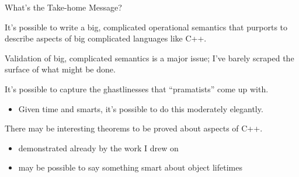 \documentclass[compress,dvips,color=usenames,xcolor=dvipsnames]{beamer}
\newcommand{\cpp}{\mbox{C\hspace{-.1em}+\hspace{-.05em}+}}
\begin{document}
\begin{frame}{What's the Take-home Message?}

It's possible to write a big, complicated operational semantics that
purports to describe aspects of big complicated languages like \cpp{}.

\bigskip
Validation of big, complicated semantics is a major issue; I've barely
scraped the surface of what might be done.

\bigskip
It's possible to capture the ghastlinesses that ``pramatists'' come
up with.  
\begin{itemize}
\item Given time and smarts, it's possible to do this moderately
elegantly. 
\end{itemize}

\bigskip
There may be interesting theorems to be proved about aspects of
\cpp{}. 
\begin{itemize}
\item demonstrated already by the work I drew on
\item may be possible to say something smart about object lifetimes
\end{itemize}
  

\end{frame}
\end{document}
